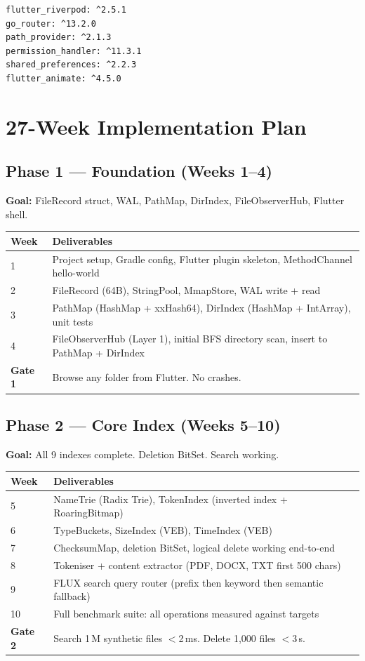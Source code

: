 \begin{lstlisting}[caption=Flutter dependencies (pubspec.yaml)]
flutter_riverpod: ^2.5.1
go_router: ^13.2.0
path_provider: ^2.1.3
permission_handler: ^11.3.1
shared_preferences: ^2.2.3
flutter_animate: ^4.5.0
\end{lstlisting}

\chapter{27-Week Implementation Plan}

\section{Phase 1 --- Foundation (Weeks 1--4)}

\textbf{Goal:} FileRecord struct, WAL, PathMap, DirIndex, FileObserverHub, Flutter shell.

\begin{longtable}{@{}p{14mm}p{126mm}@{}}
\toprule
\textbf{Week} & \textbf{Deliverables} \\
\midrule
1 & Project setup, Gradle config, Flutter plugin skeleton, MethodChannel hello-world \\
2 & FileRecord (64B), StringPool, MmapStore, WAL write + read \\
3 & PathMap (HashMap + xxHash64), DirIndex (HashMap + IntArray), unit tests \\
4 & FileObserverHub (Layer 1), initial BFS directory scan, insert to PathMap + DirIndex \\
\midrule
\textbf{Gate 1} & Browse any folder from Flutter. No crashes. \\
\bottomrule
\end{longtable}

\section{Phase 2 --- Core Index (Weeks 5--10)}

\textbf{Goal:} All 9 indexes complete. Deletion BitSet. Search working.

\begin{longtable}{@{}p{14mm}p{126mm}@{}}
\toprule
\textbf{Week} & \textbf{Deliverables} \\
\midrule
5 & NameTrie (Radix Trie), TokenIndex (inverted index + RoaringBitmap) \\
6 & TypeBuckets, SizeIndex (VEB), TimeIndex (VEB) \\
7 & ChecksumMap, deletion BitSet, logical delete working end-to-end \\
8 & Tokeniser + content extractor (PDF, DOCX, TXT first 500 chars) \\
9 & FLUX search query router (prefix then keyword then semantic fallback) \\
10 & Full benchmark suite: all operations measured against targets \\
\midrule
\textbf{Gate 2} & Search 1\,M synthetic files $<$2\,ms. Delete 1,000 files $<$3\,s. \\
\bottomrule
\end{longtable}

